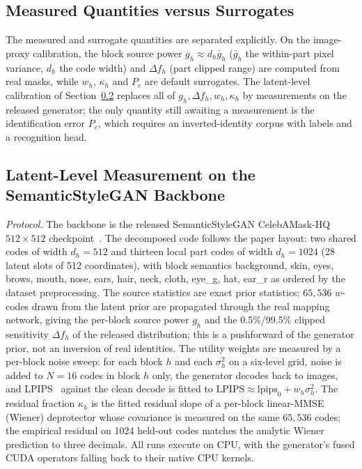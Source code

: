 \documentclass{ieeetj}
\theoremstyle{plain}
\theoremstyle{definition}
\begin{document}
\subsection{Measured Quantities versus Surrogates}

The measured and surrogate quantities are separated explicitly. On the
image-proxy calibration, the block source power $g_h\approx d_h\bar g_h$
($\bar g_h$ the within-part pixel variance, $d_h$ the code width) and
$\Delta f_h$ (part clipped range) are computed from real masks, while $w_h$,
$\kappa_h$ and $P_e$ are default surrogates. The latent-level calibration of
Section~\ref{sec:latent} replaces all of $g_h,\Delta f_h,w_h,\kappa_h$ by
measurements on the released generator; the only quantity still awaiting a
measurement is the identification error $P_e$, which requires an
inverted-identity corpus with labels and a recognition head.

\subsection{Latent-Level Measurement on the SemanticStyleGAN Backbone}
\label{sec:latent}

\emph{Protocol.} The backbone is the released SemanticStyleGAN
CelebAMask-HQ $512{\times}512$ checkpoint~\cite{semanticstylegan,celebamaskhq}.
The decomposed code follows the paper layout: two shared codes of width
$d_h=512$ and thirteen local part codes of width $d_h=1024$ (28 latent slots
of 512 coordinates), with block semantics background, skin, eyes, brows,
mouth, nose, ears, hair, neck, cloth, eye\_g, hat, ear\_r as ordered by the
dataset preprocessing. The source statistics are exact prior statistics:
$65{,}536$ $w$-codes drawn from the latent prior are propagated through the
real mapping network, giving the per-block source power $g_h$ and the
0.5\%/99.5\% clipped sensitivity $\Delta f_h$ of the released distribution;
this is a pushforward of the generator prior, not an inversion of real
identities. The utility weights are measured by a per-block noise sweep: for
each block $h$ and each $\sigma_h^2$ on a six-level grid, noise is added to
$N=16$ codes in block $h$ only, the generator decodes back to images, and
LPIPS~\cite{lpips} against the clean decode is fitted to
$\mathrm{LPIPS}\approx\mathrm{lpips}_0+w_h\sigma_h^2$. The residual fraction
$\kappa_h$ is the fitted residual slope of a per-block linear-MMSE (Wiener)
deprotector whose covariance is measured on the same $65{,}536$ codes; the
empirical residual on 1024 held-out codes matches the analytic Wiener
prediction to three decimals. All runs execute on CPU, with the generator's
fused CUDA operators falling back to their native CPU kernels.
\end{document}
